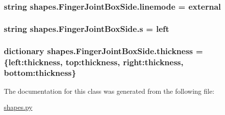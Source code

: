 \subsubsection[{linemode}]{\setlength{\rightskip}{0pt plus 5cm}string shapes.\+Finger\+Joint\+Box\+Side.\+linemode = \textquotesingle{}external\textquotesingle{}\hspace{0.3cm}{\ttfamily [static]}}\label{classshapes_1_1_finger_joint_box_side_a85cade359cd34d777158202cc3e6674a}
\hypertarget{classshapes_1_1_finger_joint_box_side_a78fb54597f90413a205b9d7a0adc6c0c}{}
\subsubsection[{s}]{\setlength{\rightskip}{0pt plus 5cm}string shapes.\+Finger\+Joint\+Box\+Side.\+s = \textquotesingle{}left\textquotesingle{}\hspace{0.3cm}{\ttfamily [static]}}\label{classshapes_1_1_finger_joint_box_side_a78fb54597f90413a205b9d7a0adc6c0c}
\hypertarget{classshapes_1_1_finger_joint_box_side_a1b08f1a625b6b1bca02dc4dd42d515ea}{}
\subsubsection[{thickness}]{\setlength{\rightskip}{0pt plus 5cm}dictionary shapes.\+Finger\+Joint\+Box\+Side.\+thickness = \{\textquotesingle{}left\textquotesingle{}\+:thickness, \textquotesingle{}top\textquotesingle{}\+:thickness, \textquotesingle{}right\textquotesingle{}\+:thickness, \textquotesingle{}bottom\textquotesingle{}\+:thickness\}\hspace{0.3cm}{\ttfamily [static]}}\label{classshapes_1_1_finger_joint_box_side_a1b08f1a625b6b1bca02dc4dd42d515ea}


The documentation for this class was generated from the following file\+:\begin{DoxyCompactItemize}
\item 
\hyperlink{shapes_8py}{shapes.\+py}\end{DoxyCompactItemize}
